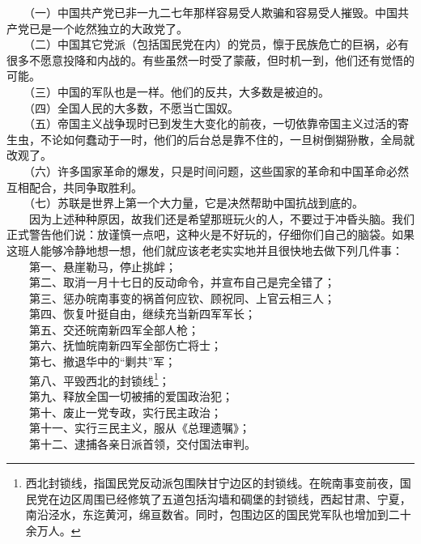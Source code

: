 \documentclass[cn,11pt,chinese]{elegantbook}
\begin{document}
　　（一）中国共产党已非一九二七年那样容易受人欺骗和容易受人摧毁。中国共产党已是一个屹然独立的大政党了。\\
　　（二）中国其它党派（包括国民党在内）的党员，懔于民族危亡的巨祸，必有很多不愿意投降和内战的。有些虽然一时受了蒙蔽，但时机一到，他们还有觉悟的可能。\\
　　（三）中国的军队也是一样。他们的反共，大多数是被迫的。\\
　　（四）全国人民的大多数，不愿当亡国奴。\\
　　（五）帝国主义战争现时已到发生大变化的前夜，一切依靠帝国主义过活的寄生虫，不论如何蠢动于一时，他们的后台总是靠不住的，一旦树倒猢狲散，全局就改观了。\\
　　（六）许多国家革命的爆发，只是时间问题，这些国家的革命和中国革命必然互相配合，共同争取胜利。\\
　　（七）苏联是世界上第一个大力量，它是决然帮助中国抗战到底的。\\
　　因为上述种种原因，故我们还是希望那班玩火的人，不要过于冲昏头脑。我们正式警告他们说：放谨慎一点吧，这种火是不好玩的，仔细你们自己的脑袋。如果这班人能够冷静地想一想，他们就应该老老实实地并且很快地去做下列几件事：\\
　　第一、悬崖勒马，停止挑衅；\\
　　第二、取消一月十七日的反动命令，并宣布自己是完全错了；\\
　　第三、惩办皖南事变的祸首何应钦、顾祝同、上官云相三人；\\
　　第四、恢复叶挺自由，继续充当新四军军长；\\
　　第五、交还皖南新四军全部人枪；\\
　　第六、抚恤皖南新四军全部伤亡将士；\\
　　第七、撤退华中的“剿共”军；\\
　　第八、平毁西北的封锁线\footnote[4]{ 西北封锁线，指国民党反动派包围陕甘宁边区的封锁线。在皖南事变前夜，国民党在边区周围已经修筑了五道包括沟墙和碉堡的封锁线，西起甘肃、宁夏，南沿泾水，东迄黄河，绵亘数省。同时，包围边区的国民党军队也增加到二十余万人。}；\\
　　第九、释放全国一切被捕的爱国政治犯；\\
　　第十、废止一党专政，实行民主政治；\\
　　第十一、实行三民主义，服从《总理遗嘱》；\\
　　第十二、逮捕各亲日派首领，交付国法审判。\\
\end{document}
